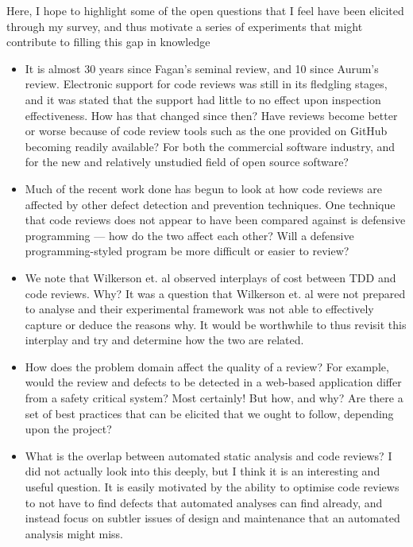 Here, I hope to highlight some of the open questions that I feel have been elicited through my
survey, and thus motivate a series of experiments that might contribute to filling this gap in
knowledge

\begin{itemize}
	\item It is almost 30 years since Fagan's seminal review, and 10 since Aurum's review. Electronic
		support for code reviews was still in its fledgling stages, and it was stated that the support
		had little to no effect upon inspection effectiveness. How has that changed since then? Have
		reviews become better or worse because of code review tools such as the one provided on GitHub
		becoming readily available?
		For both the commercial software industry, and for the new and relatively unstudied field of open source software?
	\item Much of the recent work done has begun to look at how code reviews are affected by other
		defect detection and prevention techniques.
		One technique that code reviews does not appear to have been compared against is defensive
		programming --- how do the two affect each other?
		Will a defensive programming-styled program be more difficult or easier to review?
	\item We note that Wilkerson et. al \cite{wilkerson2012comparing} observed interplays of cost
		between TDD and code reviews. Why? It was a question that Wilkerson et. al were not prepared to analyse
		and their experimental framework was not able to effectively capture or deduce the reasons why.
		It would be worthwhile to thus revisit this interplay and try and determine how the two are
		related.
	\item How does the problem domain affect the quality of a review? For example, would the review
		and defects to be detected in a web-based application differ from a safety critical system? Most
		certainly! But how, and why? Are there a set of best practices that can be elicited that we
		ought to follow, depending upon the project?
	\item What is the overlap between automated static analysis and code reviews? I did not actually
		look into this deeply, but I think it is an interesting and useful question. It is easily
		motivated by the ability to optimise code reviews to not have to find defects that automated
		analyses can find already, and instead focus on subtler issues of design and maintenance that an
		automated analysis might miss.
\end{itemize}
